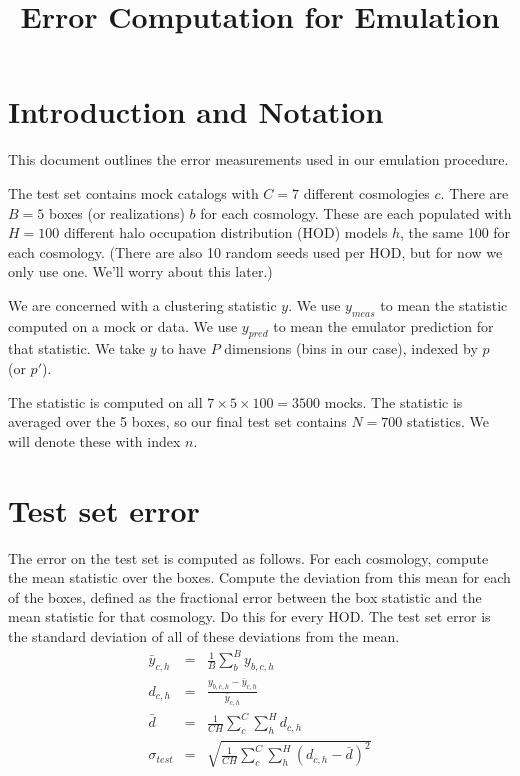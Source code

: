 \documentclass[12pt]{article}
\title{Error Computation for Emulation}
\begin{document}
\maketitle

\section{Introduction and Notation}

This document outlines the error measurements used in our emulation procedure.

The test set contains mock catalogs with $C=7$ different cosmologies $c$. There are $B=5$ boxes (or realizations) $b$ for each cosmology. These are each populated with $H=100$ different halo occupation distribution (HOD) models $h$, the same 100 for each cosmology. (There are also 10 random seeds used per HOD, but for now we only use one. We'll worry about this later.)

We are concerned with a clustering statistic $y$. We use $y_{meas}$ to mean the statistic computed on a mock or data. We use $y_{pred}$ to mean the emulator prediction for that statistic. We take $y$ to have $P$ dimensions (bins in our case), indexed by $p$ (or $p'$).

The statistic is computed on all $7 \times 5 \times 100 = 3500$ mocks. The statistic is averaged over the 5 boxes, so our final test set contains $N=700$ statistics. We will denote these with index $n$.

\section{Test set error}

The error on the test set is computed as follows. 
For each cosmology, compute the mean statistic over the boxes.
 Compute the deviation from this mean for each of the boxes, defined as the fractional error between the box statistic and the mean statistic for that cosmology. 
 Do this for every HOD. 
 The test set error is the standard deviation of all of these deviations from the mean.
\begin{eqnarray}
    \bar{y}_{c,h} &=& \frac{1}{B} \sum_b^B {y_{b,c,h}} \\
    d_{c,h} &=& \frac{ {y_{b,c,h} - \bar{y}_{c,h}} } {\bar{y}_{c,h}} \\
    \bar{d} &=& \frac{1}{CH} \sum_{c}^C \sum_{h}^H d_{c,h} \\
    \sigma_{test} &=& \sqrt{ \frac{1}{CH} \sum_{c}^C \sum_{h}^H (d_{c,h} - \bar{d})^2 }
\end{eqnarray}
\end{document}
